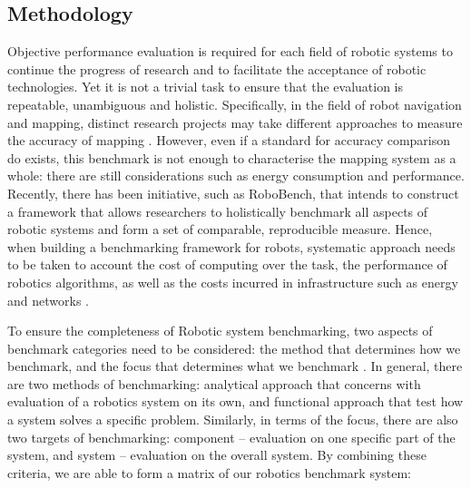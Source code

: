 \subsection{Methodology}
Objective performance evaluation is required for each field of robotic systems to continue the progress of research and to facilitate the acceptance of robotic technologies. 
Yet it is not a trivial task to ensure that the evaluation is repeatable, unambiguous and holistic. Specifically, in the field of robot navigation and mapping, distinct research projects may take different approaches to measure the accuracy of mapping \cite{sturm2012benchmark} \cite{handa2014benchmark}. 
However, even if a standard for accuracy comparison do exists, this benchmark is not enough to characterise the mapping system as a whole: there are still considerations such as energy consumption and performance. 
Recently, there has been initiative, such as RoboBench, that intends to construct a framework that allows researchers to holistically benchmark all aspects of robotic systems and form a set of comparable, reproducible measure. 
Hence, when building a benchmarking framework for robots, systematic approach needs to be taken to account the cost of computing over the task, the performance of robotics algorithms, as well as the costs incurred in infrastructure such as energy and networks \cite{weisz2016robobench}.

To ensure the completeness of Robotic system benchmarking, two aspects of benchmark categories need to be considered: the method that determines how we benchmark, and the focus that determines what we benchmark \cite{del2006benchmarks}. 
In general, there are two methods of benchmarking: analytical approach that concerns with evaluation of a robotics system on its own, and functional approach that test how a system solves a specific problem. 
Similarly, in terms of the focus, there are also two targets of benchmarking: component – evaluation on one specific part of the system, and system – evaluation on the overall system. 
By combining these criteria, we are able to form a matrix of our robotics benchmark system:


